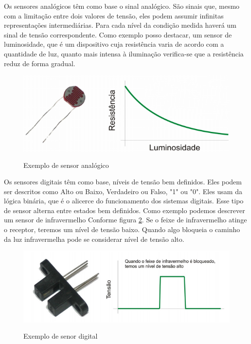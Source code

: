 Os sensores analógicos têm como base o sinal analógico. São sinais que, mesmo com a limitação entre dois valores de tensão, eles podem assumir infinitas representações intermediárias. Para cada nível da condição medida haverá um sinal de tensão correspondente. Como exemplo posso destacar, um sensor de luminosidade, que é um dispositivo cuja resistência varia de acordo com a quantidade de luz, quanto mais intensa à iluminação verifica-se que a resistência reduz de forma gradual.

\begin{figure} [h!]
    \centering
    \caption{Exemplo de sensor analógico}
    \includegraphics [scale = 0.5] {Figuras/sensor_analogico.jpg}
    \label{fig:cinco}
\end{figure}


Os sensores digitais têm como base, níveis de tensão bem definidos. Eles podem ser descritos como Alto ou Baixo, Verdadeiro ou Falso, "1" ou "0". Eles usam da lógica binária, que é o alicerce do funcionamento dos sistemas digitais. Esse tipo de sensor alterna entre estados bem definidos. Como exemplo podemos descrever um sensor de infravermelho Conforme figura \ref{fig:infraVermelho}. Se o feixe de infravermelho atinge o receptor, teremos um nível de tensão baixo. Quando algo bloqueia o caminho da luz infravermelha pode se considerar nível de tensão alto.

\begin{figure} [h!]
    \centering
    \caption{Exemplo de senor digital}
    \includegraphics [scale = 0.5] {Figuras/sensor_digital.png}
    \label{fig:infraVermelho}
\end{figure}

